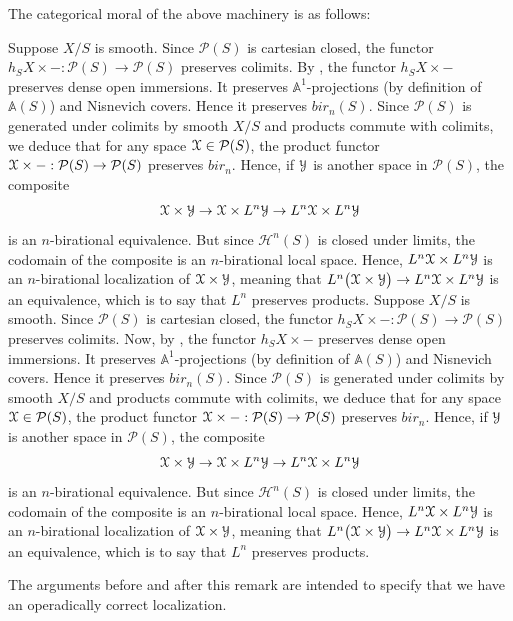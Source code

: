 \begin{rem}
    The categorical moral of the above machinery is as follows:
    
    Suppose $X/S$ is smooth. Since $\mathcal{P}(S)$ is cartesian closed, the functor $h_SX\times-: \mathcal{P}(S)\to \mathcal{P}(S)$ preserves colimits. By , the functor $h_SX\times-$ preserves dense open immersions. It preserves $\mathbb{A}^1$-projections (by definition of $\mathbb{A}(S)$) and Nisnevich covers. Hence it preserves $bir_n(S)$. Since $\mathcal{P}(S)$ is generated under colimits by smooth $X/S$ and products commute with colimits, we deduce that for any space $\EuScript{X}\in \mathcal{P}(S)$, the product functor $\EuScript{X}\times-: \mathcal{P}(S)\to \mathcal{P}(S)$ preserves $bir_n$. Hence, if $\EuScript{Y} $ is another space in $\mathcal{P}(S) $, the composite $$\EuScript{X}\times \EuScript{Y}\to\EuScript{X}\times L ^n\EuScript{Y} \to L^n\EuScript{X}\times L^n \EuScript{Y}$$ is an $n$-birational equivalence. But since $\mathcal{H}^{n}(S)$ is closed under limits, the codomain of the composite is an $n$-birational local space. Hence, $L^n\EuScript{X}\times L^n \EuScript{Y}$ is an $n$-birational localization of $\EuScript{X}\times\EuScript{Y}$, meaning that $L^n\big(\EuScript{X}\times\EuScript{Y}\big)\to L^n\EuScript{X}\times L^n \EuScript{Y}$ is an equivalence, which is to say that $L^n$ preserves products. 
    Suppose $X/S$ is smooth. Since $\mathcal{P}(S)$ is cartesian closed, the functor $h_SX\times-: \mathcal{P}(S)\to \mathcal{P}(S)$ preserves colimits. Now, by , the functor $h_SX\times-$ preserves dense open immersions. It preserves $\mathbb{A}^1$-projections (by definition of $\mathbb{A}(S)$) and Nisnevich covers. Hence it preserves $bir_n(S)$. Since $\mathcal{P}(S)$ is generated under colimits by smooth $X/S$ and products commute with colimits, we deduce that for any space $\EuScript{X}\in \mathcal{P}(S)$, the product functor $\EuScript{X}\times-: \mathcal{P}(S)\to \mathcal{P}(S)$ preserves $bir_n$. Hence, if $\EuScript{Y} $ is another space in $\mathcal{P}(S) $, the composite $$\EuScript{X}\times \EuScript{Y}\to\EuScript{X}\times L ^n\EuScript{Y} \to L^n\EuScript{X}\times L^n \EuScript{Y}$$ is an $n$-birational equivalence. But since $\mathcal{H}^{n}(S)$ is closed under limits, the codomain of the composite is an $n$-birational local space. Hence, $L^n\EuScript{X}\times L^n \EuScript{Y}$ is an $n$-birational localization of $\EuScript{X}\times\EuScript{Y}$, meaning that $L^n\big(\EuScript{X}\times\EuScript{Y}\big)\to L^n\EuScript{X}\times L^n \EuScript{Y}$ is an equivalence, which is to say that $L^n$ preserves products. 


    The arguments before and after this remark are intended to specify that we have an operadically correct localization.
 \end{rem}

